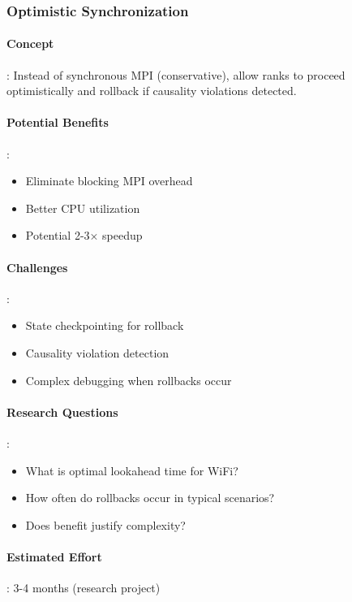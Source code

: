 \subsubsection{Optimistic Synchronization}

\paragraph{Concept}:
Instead of synchronous MPI (conservative), allow ranks to proceed optimistically and rollback if causality violations detected.

\paragraph{Potential Benefits}:
\begin{itemize}
    \item Eliminate blocking MPI overhead
    \item Better CPU utilization
    \item Potential 2-3× speedup
\end{itemize}

\paragraph{Challenges}:
\begin{itemize}
    \item State checkpointing for rollback
    \item Causality violation detection
    \item Complex debugging when rollbacks occur
\end{itemize}

\paragraph{Research Questions}:
\begin{itemize}
    \item What is optimal lookahead time for WiFi?
    \item How often do rollbacks occur in typical scenarios?
    \item Does benefit justify complexity?
\end{itemize}

\paragraph{Estimated Effort}: 3-4 months (research project)

